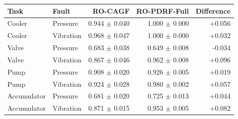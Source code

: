 \begin{tabular}{llrrr}
\toprule
Task & Fault & RO-CAGF & RO-PDRF-Full & Difference \\
\midrule
Cooler & Pressure & 0.944 $\pm$ 0.040 & 1.000 $\pm$ 0.000 & +0.056 \\
Cooler & Vibration & 0.968 $\pm$ 0.047 & 1.000 $\pm$ 0.000 & +0.032 \\
Valve & Pressure & 0.683 $\pm$ 0.038 & 0.649 $\pm$ 0.008 & -0.034 \\
Valve & Vibration & 0.867 $\pm$ 0.046 & 0.962 $\pm$ 0.008 & +0.096 \\
Pump & Pressure & 0.908 $\pm$ 0.020 & 0.926 $\pm$ 0.005 & +0.019 \\
Pump & Vibration & 0.924 $\pm$ 0.028 & 0.980 $\pm$ 0.002 & +0.057 \\
Accumulator & Pressure & 0.681 $\pm$ 0.020 & 0.725 $\pm$ 0.013 & +0.044 \\
Accumulator & Vibration & 0.871 $\pm$ 0.015 & 0.953 $\pm$ 0.005 & +0.082 \\
\bottomrule
\end{tabular}